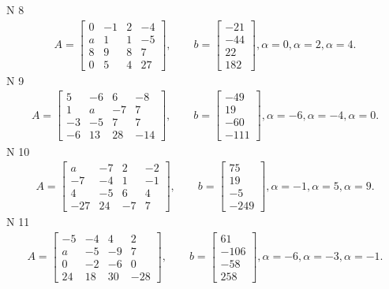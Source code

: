 \documentclass[11pt]{report}
\begin{document}
N 8
\begin{align*}
 A = \left[\begin{matrix}0 & -1 & 2 & -4\\a & 1 & 1 & -5\\8 & 9 & 8 & 7\\0 & 5 & 4 & 27\end{matrix}\right],
    \qquad b = \left[\begin{matrix}-21\\-44\\22\\182\end{matrix}\right], \alpha = 0, \alpha = 2, \alpha = 4. 
 \end{align*}
N 9
\begin{align*}
 A = \left[\begin{matrix}5 & -6 & 6 & -8\\1 & a & -7 & 7\\-3 & -5 & 7 & 7\\-6 & 13 & 28 & -14\end{matrix}\right],
    \qquad b = \left[\begin{matrix}-49\\19\\-60\\-111\end{matrix}\right], \alpha = -6, \alpha = -4, \alpha = 0. 
 \end{align*}
N 10
\begin{align*}
 A = \left[\begin{matrix}a & -7 & 2 & -2\\-7 & -4 & 1 & -1\\4 & -5 & 6 & 4\\-27 & 24 & -7 & 7\end{matrix}\right],
    \qquad b = \left[\begin{matrix}75\\19\\-5\\-249\end{matrix}\right], \alpha = -1, \alpha = 5, \alpha = 9. 
 \end{align*}
N 11
\begin{align*}
 A = \left[\begin{matrix}-5 & -4 & 4 & 2\\a & -5 & -9 & 7\\0 & -2 & -6 & 0\\24 & 18 & 30 & -28\end{matrix}\right],
    \qquad b = \left[\begin{matrix}61\\-106\\-58\\258\end{matrix}\right], \alpha = -6, \alpha = -3, \alpha = -1. 
 \end{align*}
\end{document}
